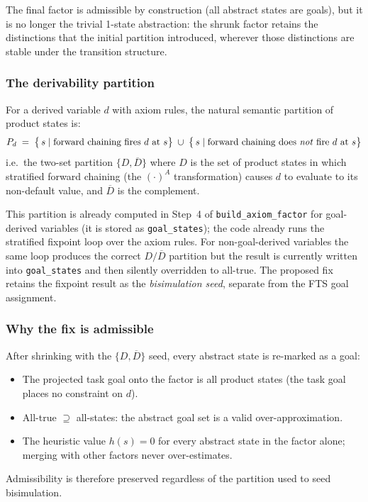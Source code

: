 \documentclass[11pt,a4paper]{article}
\begin{document}
\begin{enumerate}
    The final factor is admissible by construction (all abstract states are
    goals), but it is no longer the trivial 1-state abstraction: the shrunk
    factor retains the distinctions that the initial partition introduced,
    wherever those distinctions are stable under the transition structure.

    \subsubsection*{The derivability partition}

    For a derived variable $d$ with axiom rules, the natural semantic
    partition of product states is:
    \[
      P_d \;=\; \bigl\{\,s \mid \text{forward chaining fires } d \text{ at } s\bigr\}
      \;\cup\;
      \bigl\{\,s \mid \text{forward chaining does \emph{not} fire } d \text{ at } s\bigr\}
    \]
    i.e.\ the two-set partition $\{D, \overline{D}\}$ where $D$ is the set of
    product states in which stratified forward chaining (the $(\cdot)^A$
    transformation) causes $d$ to evaluate to its non-default value, and
    $\overline{D}$ is the complement.

    This partition is already computed in Step~4 of \texttt{build\_axiom\_factor}
    for goal-derived variables (it is stored as \texttt{goal\_states}); the
    code already runs the stratified fixpoint loop over the axiom rules.  For
    non-goal-derived variables the same loop produces the correct $D /
    \overline{D}$ partition but the result is currently written into
    \texttt{goal\_states} and then silently overridden to all-true.  The
    proposed fix retains the fixpoint result as the \emph{bisimulation seed},
    separate from the FTS goal assignment.

    \subsubsection*{Why the fix is admissible}

    After shrinking with the $\{D, \overline{D}\}$ seed, every abstract state
    is re-marked as a goal:
    \begin{itemize}
      \item The projected task goal onto the factor is all product states
        (the task goal places no constraint on $d$).
      \item All-true $\supseteq$ all-states: the abstract goal set is a valid
        over-approximation.
      \item The heuristic value $h(s) = 0$ for every abstract state in the
        factor alone; merging with other factors never over-estimates.
    \end{itemize}
    Admissibility is therefore preserved regardless of the partition used to
    seed bisimulation.


\end{enumerate}
\end{document}
